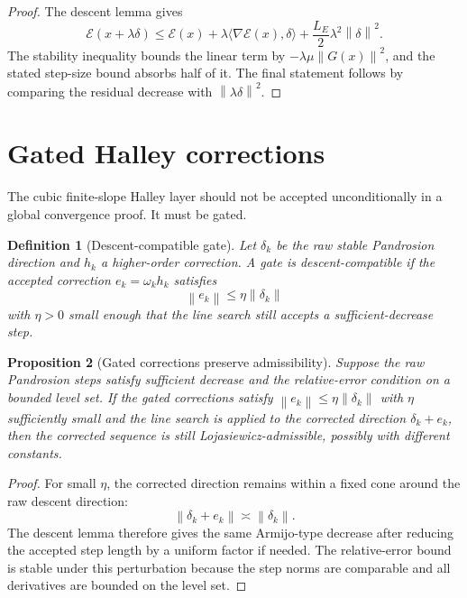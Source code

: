 \documentclass[11pt]{article}
\newtheorem{definition}{Definition}[section]
\newtheorem{proposition}[definition]{Proposition}
\newcommand{\E}{\mathcal E}
\newcommand{\norm}[1]{\left\lVert #1\right\rVert}
\begin{document}
\begin{proof}
The descent lemma gives
\[
        \E(x+\lambda\delta)
        \le
        \E(x)+\lambda\langle\nabla\E(x),\delta\rangle
        +\frac{L_E}{2}\lambda^2\norm{\delta}^2.
\]
The stability inequality bounds the linear term by \(-\lambda\mu\norm{G(x)}^2\), and the stated step-size bound absorbs half of it. The final statement follows by comparing the residual decrease with \(\norm{\lambda\delta}^2\).
\end{proof}

\section{Gated Halley corrections}

The cubic finite-slope Halley layer should not be accepted unconditionally in a global convergence proof. It must be gated.

\begin{definition}[Descent-compatible gate]
Let \(\delta_k\) be the raw stable Pandrosion direction and \(h_k\) a higher-order correction. A gate is descent-compatible if the accepted correction \(e_k=\omega_k h_k\) satisfies
\[
        \norm{e_k}\le \eta\norm{\delta_k}
\]
with \(\eta>0\) small enough that the line search still accepts a sufficient-decrease step.
\end{definition}

\begin{proposition}[Gated corrections preserve admissibility]\label{prop:gated}
Suppose the raw Pandrosion steps satisfy sufficient decrease and the relative-error condition on a bounded level set. If the gated corrections satisfy \(\norm{e_k}\le\eta\norm{\delta_k}\) with \(\eta\) sufficiently small and the line search is applied to the corrected direction \(\delta_k+e_k\), then the corrected sequence is still Lojasiewicz-admissible, possibly with different constants.
\end{proposition}

\begin{proof}
For small \(\eta\), the corrected direction remains within a fixed cone around the raw descent direction:
\[
        \norm{\delta_k+e_k}\asymp \norm{\delta_k}.
\]
The descent lemma therefore gives the same Armijo-type decrease after reducing the accepted step length by a uniform factor if needed. The relative-error bound is stable under this perturbation because the step norms are comparable and all derivatives are bounded on the level set.
\end{proof}
\end{document}
